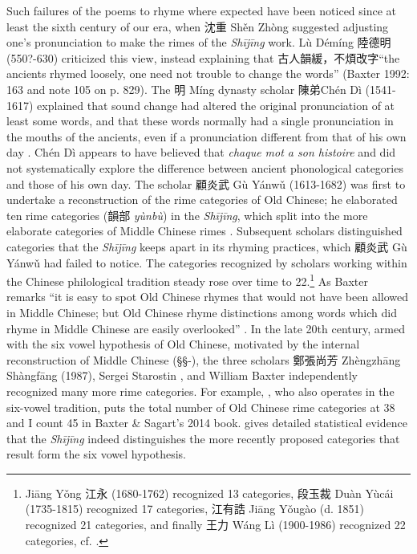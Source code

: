 Such failures of the poems to rhyme where expected have been noticed
since at least the sixth century of our era, when 沈重 Shěn Zhòng
suggested adjusting one's pro­nun­ci­a­tion to make the rimes of the
 \emph{Shījīng} work. Lù Démíng 陸德明 (550?-630) criticized this view,
instead explaining that 古人韻緩，不煩改字``the ancients rhymed loosely,
one need not trouble to change the words'' (Baxter 1992: 163 and note
105 on p. 829). The 明 Míng dynasty scholar 陳弟Chén Dì (1541-1617)
explained that sound change had altered the original pro­nun­ci­a­tion
of at least some words, and that these words normally had a single
pro­nun­ci­a­tion in the mouths of the ancients, even if a
pro­nun­ci­a­tion different from that of his own day 
\citep[154]{Baxter1992}.
Chén Dì appears to have believed that  \emph{chaque mot a son histoire}
and did not systematically explore the difference between ancient
phonological categories and those of his own day. The scholar 顧炎武 Gù
Yánwǔ (1613-1682) was first to undertake a reconstruction of the rime
categories of Old Chinese; he elaborated ten rime categories (韻部
 \emph{yùnbù}) in the \emph{Shījīng}, which split into the more elaborate
categories of Middle Chinese rimes 
\citep[155-157]{Baxter1992}. Subsequent
scholars distinguished categories that the \emph{Shījīng} keeps apart in
its rhyming practices, which 顧炎武 Gù Yánwǔ had failed to notice. The
categories re­cog­nized by scholars working within the Chinese
philo­logical tradition steady rose over time to 22.\footnote{Jiāng Yǒng
  江永 (1680-1762) recognized 13 categories, 段玉裁 Duàn Yùcái
  (1735-1815) recognized 17 categories, 江有誥 Jiāng Yǒugào (d. 1851)
  recognized 21 categories, and finally 王力 Wáng Lì (1900-1986)
  recognized 22 categories, cf. 
  \citet[157-171]{Baxter1992}.} As Baxter
remarks ``it is easy to spot Old Chinese rhymes that would not have been
allowed in Middle Chinese; but Old Chinese rhyme distinctions among
words which did rhyme in Middle Chinese are easily overlooked'' 
\citep[159]{Baxter1992}. In the late 20th century, armed with the six vowel hypothesis of
Old Chinese, motivated by the internal reconstruction of Middle Chinese
(§§-), the three scholars 鄭張尚芳 Zhèngzhāng Shàngfāng (1987), Sergei
Starostin 
\citeyearpar[]{Starostin89}, and William Baxter 
\citeyearpar{Baxter1992} independently recognized
many more rime categories. For example,
\citet[]{Schuessler2009minimal}, who also
operates in the six-vowel tradition, puts the total number of Old
Chinese rime categories at 38 and I count 45 in Baxter \& Sagart's 2014
book. 
\citet[]{Baxter1992} gives detailed statistical evidence that the
 \emph{Shījīng} indeed distinguishes the more recently proposed
categories that result form the six vowel hypothesis.

